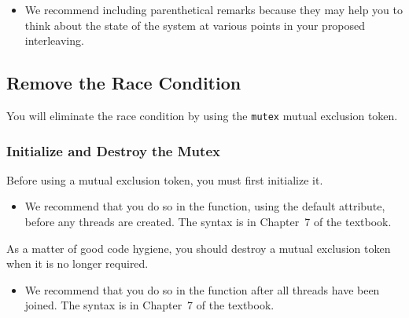     \begin{description}
        \begin{itemize}
            \item We recommend including parenthetical remarks because they may help you to think about the state of the system at various points in your proposed interleaving.
        \end{itemize}
    \end{description}

    \subsection{Remove the Race Condition}

    You will eliminate the race condition by using the \lstinline{mutex} mutual exclusion token.

    \subsubsection{Initialize and Destroy the Mutex}

    Before using a mutual exclusion token, you must first initialize it.
    \begin{description}
        \begin{itemize}
            \item We recommend that you do so in the  function, using the default attribute, before any threads are created.
                The syntax is in Chapter~7 of the textbook.
        \end{itemize}
    \end{description}

    As a matter of good code hygiene, you should destroy a mutual exclusion token when it is no longer required.
    \begin{description}
        \begin{itemize}
            \item We recommend that you do so in the  function after all threads have been joined.
                The syntax is in Chapter~7 of the textbook.
        \end{itemize}
    \end{description}

